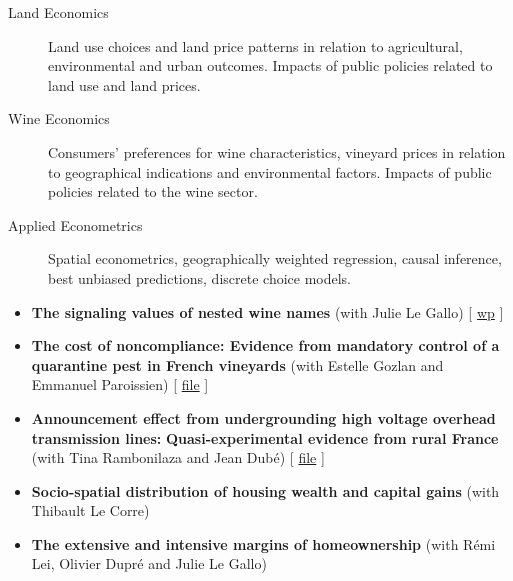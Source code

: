 \documentclass[11pt, a4paper]{./style}
\begin{document}
\label{sec:orgd699571}

\begin{description}
\item[{Land Economics}] Land use choices and land price patterns in
relation to agricultural, environmental and urban
outcomes. Impacts of public policies related to land use and land
prices.
\item[{Wine Economics}] Consumers' preferences for wine characteristics,
vineyard prices in relation to geographical indications and
environmental factors. Impacts of public policies related to the
wine sector.
\item[{Applied Econometrics}] Spatial econometrics, geographically
weighted regression, causal inference, best unbiased predictions,
discrete choice models.
\end{description}

\label{sec:org9ed2b8e}

\begin{itemize}
\item \textbf{The signaling values of nested wine names} (with Julie Le
Gallo) [ \href{https://wine-economics.org/wp-content/uploads/2021/05/AAWE\_WP265.pdf}{wp} ]
\item \textbf{The cost of noncompliance: Evidence from mandatory control of a
quarantine pest in French vineyards} (with Estelle Gozlan and
Emmanuel Paroissien) [ \href{doc/RISCA-FILE.pdf}{file} ]
\item \textbf{Announcement effect from undergrounding high voltage overhead
transmission lines:} \textbf{Quasi-experimental evidence from rural
France} (with Tina Rambonilaza and Jean Dubé) [ \href{doc/HVTOL-FILE.pdf}{file} ]
\item \textbf{Socio-spatial distribution of housing wealth and capital gains}
(with Thibault Le Corre)
\item \textbf{The extensive and intensive margins of homeownership} (with Rémi
Lei, Olivier Dupré and Julie Le Gallo)
\end{itemize}

\label{sec:org7ad36d5}
\label{sec:orgcdeb3fd}
\end{document}
